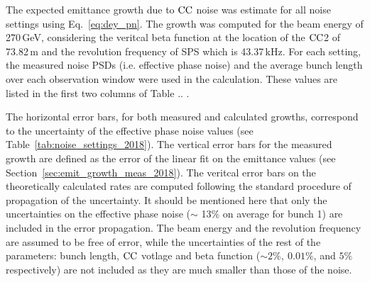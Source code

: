 The expected emittance growth due to ${\mathrm{CC}}$ noise was estimate for all noise settings using Eq.~\eqref{eq:dey_pn}. The growth was computed for the beam energy of 270\,GeV, considering the veritcal beta function at the location of the ${\mathrm{CC}}$2 of 73.82\,m and the revolution frequency of SPS which is 43.37\,kHz. For each setting, the measured noise PSDs (i.e. effective phase noise) and the average bunch length over each observation window were used in the calculation. These values are listed in the first two columns of Table .. . 

The horizontal error bars, for both measured and calculated growths, correspond to the uncertainty of the effective phase noise values (see Table~\ref{tab:noise_settings_2018}). The vertical error bars for the measured growth are defined as the error of the linear fit on the emittance values (see Section~\ref{sec:emit_growth_meas_2018}). The veritcal error bars on the theoretically calculated rates are computed following the standard procedure of propagation of the uncertainty. It should be mentioned here that only the uncertainties on the effective phase noise ($\sim$ 13\% on average for bunch 1) are included in the error propagation. The beam energy and the revolution frequency are assumed to be free of error, while the uncertainties of the rest of the parameters: bunch length, ${\mathrm{CC}}$ votlage and beta function ($\sim 2 \%, \ 0.01 \%$, and $5 \%$ respectively) are not included as they are much smaller than those of the noise.




